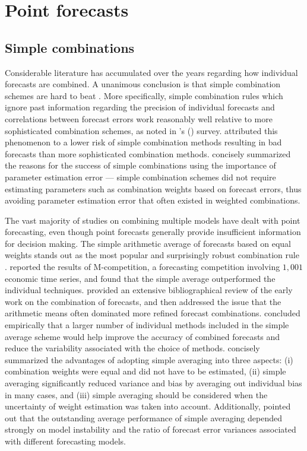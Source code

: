 \documentclass[11pt]{article}
\def\citeapos#1{\citeauthor{#1}'s (\citeyear{#1})}
\begin{document}
\section{Point forecasts}
\label{sec:point_forecasts}

\subsection{Simple combinations}
\label{sec:simple_combinations}

Considerable literature has accumulated over the years regarding how individual forecasts are combined. A unanimous conclusion is that simple combination schemes are hard to beat \citep{Clemen1989-fb,Fischer1999-kz,Stock2004-rq,Lichtendahl2020-ut}. More specifically, simple combination rules which ignore past information regarding the precision of individual forecasts and correlations between forecast errors work reasonably well relative to more sophisticated combination schemes, as noted in \citeapos{Clemen1989-fb} survey. \cite{Lichtendahl2020-ut} attributed this phenomenon to a lower risk of simple combination methods resulting in bad forecasts than more sophisticated combination methods. \cite{Timmermann2006-en} concisely summarized the reasons for the success of simple combinations using the importance of parameter estimation error --- simple combination schemes did not require estimating parameters such as combination weights based on forecast errors, thus avoiding parameter estimation error that often existed in weighted combinations.

The vast majority of studies on combining multiple models have dealt with point forecasting, even though point forecasts generally provide insufficient information for decision making. The simple arithmetic average of forecasts based on equal weights stands out as the most popular and surprisingly robust combination rule \citep[see][]{Bunn1985-vo,Clemen1986-pd,Stock2003-sp,Genre2013-ut}. \cite{Makridakis1982-hb} reported the results of M-competition, a forecasting competition involving $1,001$ economic time series, and found that the simple average outperformed the individual techniques. \cite{Clemen1989-fb} provided an extensive bibliographical review of the early work on the combination of forecasts, and then addressed the issue that the arithmetic means often dominated more refined forecast combinations. \cite{Makridakis1983-hg} concluded empirically that a larger number of individual methods included in the simple average scheme would help improve the accuracy of combined forecasts and reduce the variability associated with the choice of methods. \cite{Palm1992-im} concisely summarized the advantages of adopting simple averaging into three aspects: (i) combination weights were equal and did not have to be estimated, (ii) simple averaging significantly reduced variance and bias by averaging out individual bias in many cases, and (iii) simple averaging should be considered when the uncertainty of weight estimation was taken into account. Additionally, \cite{Timmermann2006-en} pointed out that the outstanding average performance of simple averaging depended strongly on model instability and the ratio of forecast error variances associated with different forecasting models.
\end{document}
